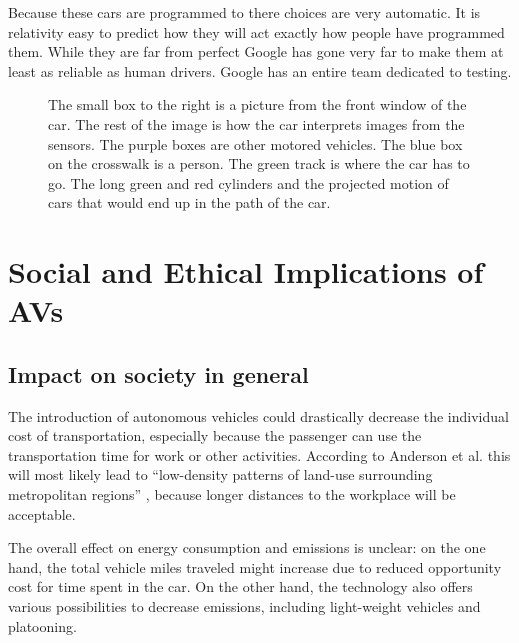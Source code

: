 \documentclass[11pt]{article}
\begin{document}
Because these cars are programmed to there choices are very automatic. It is relativity easy to predict how they will act
exactly how people have programmed them. While they are far from perfect Google has gone very far to make them at least as
reliable as human drivers. Google has an entire team dedicated to testing. 
\begin{figure}[!ht]
  \centering
                  \caption{The small box to the right is a picture from the front window of the car. The rest of the
                      image is how the car interprets images from the sensors. The purple boxes are other motored
                          vehicles. The blue box on the crosswalk is a person. The green track is where the car has to
                          go. The long green and red cylinders and the projected motion of cars that would end up in the
                  path of the car.}
\end{figure}


\section{Social and Ethical Implications of AVs}
\subsection{Impact on society in general}
The introduction of autonomous vehicles could drastically decrease the individual cost of transportation, especially because the passenger can use the transportation time for work or other activities. According to Anderson et al. this will most likely lead to ``low-density patterns of land-use surrounding metropolitan regions'' \cite{Anderson2014rand}, because longer distances to the workplace will be acceptable.

The overall effect on energy consumption and emissions is unclear: on the one hand, the total vehicle miles traveled might increase due to reduced opportunity cost for time spent in the car. On the other hand, the technology also offers various possibilities to decrease emissions, including light-weight vehicles and platooning.
\end{document}
